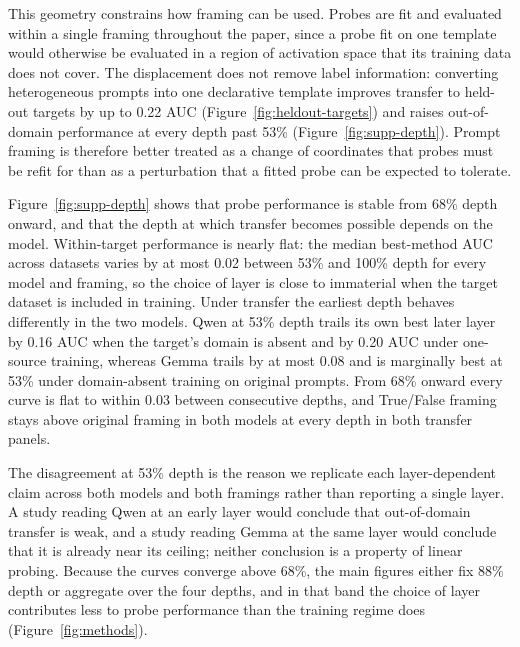 This geometry constrains how framing can be used. Probes are fit and evaluated
within a single framing throughout the paper, since a probe fit on one template
would otherwise be evaluated in a region of activation space that its training
data does not cover. The displacement does not remove label information:
converting heterogeneous prompts into one declarative template improves
transfer to held-out targets by up to 0.22 AUC
(Figure~\ref{fig:heldout-targets}) and raises out-of-domain performance at
every depth past 53\% (Figure~\ref{fig:supp-depth}). Prompt framing is
therefore better treated as a change of coordinates that probes must be refit
for than as a perturbation that a fitted probe can be expected to tolerate.



Figure~\ref{fig:supp-depth} shows that probe performance is stable from 68\%
depth onward, and that the depth at which transfer becomes possible depends on
the model. Within-target performance is nearly flat: the median best-method AUC
across datasets varies by at most 0.02 between 53\% and 100\% depth for every
model and framing, so the choice of layer is close to immaterial when the
target dataset is included in training. Under transfer the earliest depth
behaves differently in the two models. Qwen at 53\% depth trails its own best
later layer by 0.16 AUC when the target's domain is absent and by 0.20 AUC
under one-source training, whereas Gemma trails by at most 0.08 and is
marginally best at 53\% under domain-absent training on original prompts. From
68\% onward every curve is flat to within 0.03 between consecutive depths, and
True/False framing stays above original framing in both models at every depth
in both transfer panels.

The disagreement at 53\% depth is the reason we replicate each layer-dependent
claim across both models and both framings rather than reporting a single
layer. A study reading Qwen at an early layer would conclude that out-of-domain
transfer is weak, and a study reading Gemma at the same layer would conclude
that it is already near its ceiling; neither conclusion is a property of linear
probing. Because the curves converge above 68\%, the main figures either fix
88\% depth or aggregate over the four depths, and in that band the choice of
layer contributes less to probe performance than the training regime does
(Figure~\ref{fig:methods}).


